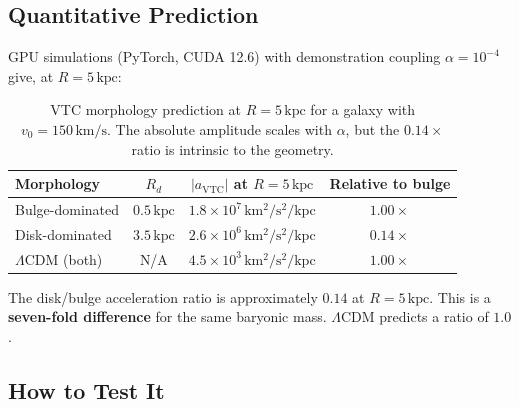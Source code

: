 \documentclass[11pt,a4paper]{article}
\theoremstyle{definition}
\newcommand{\VTC}{\mathrm{VTC}}
\begin{document}
\subsection{Quantitative Prediction}

GPU simulations (PyTorch, CUDA 12.6) with demonstration coupling $\alpha=10^{-4}$ give, at $R=5\,\mathrm{kpc}$:

\begin{table}[h]
\centering
\begin{tabular}{@{}lccc@{}}
\toprule
\textbf{Morphology} & $R_d$ & $|a_{\VTC}|$ at $R=5\,\mathrm{kpc}$ & \textbf{Relative to bulge} \\
\midrule
Bulge-dominated & $0.5\,\mathrm{kpc}$ & $1.8\times 10^{7}\,\mathrm{km^2/s^2/kpc}$ & $1.00\times$ \\
Disk-dominated & $3.5\,\mathrm{kpc}$ & $2.6\times 10^{6}\,\mathrm{km^2/s^2/kpc}$ & $\mathbf{0.14\times}$ \\
$\Lambda$CDM (both) & N/A & $4.5\times 10^{3}\,\mathrm{km^2/s^2/kpc}$ & $1.00\times$ \\
\bottomrule
\end{tabular}
\caption{VTC morphology prediction at $R=5\,\mathrm{kpc}$ for a galaxy with $v_0=150\,\mathrm{km/s}$. The absolute amplitude scales with $\alpha$, but the $0.14\times$ ratio is intrinsic to the geometry.}
\end{table}

The disk/bulge acceleration ratio is approximately $0.14$ at $R=5\,\mathrm{kpc}$. This is a \textbf{seven-fold difference} for the same baryonic mass. $\Lambda$CDM predicts a ratio of $1.0$.

\subsection{How to Test It}
\end{document}

